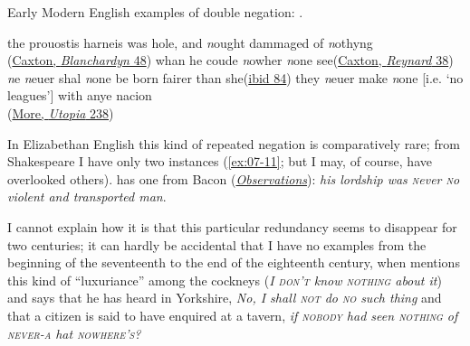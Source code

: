 Early Modern English examples of double negation: .

\ea \label{ex:07-07}
\ea the prouostis harneis was hole, and \emph{n}ought dammaged of \emph{n}othyng\\\hfill(\href{https://archive.org/details/caxtonsblanchard0000leon/page/48/mode/2up?q=%22harneis+was+hole%22&view=theater}{Caxton, \textit{Blanchardyn} 48}) %
\ex whan he coude \emph{n}owher \emph{n}one see\hfill(\href{https://archive.org/details/TheHistoryOfReynardTheFoxArber/page/n67/mode/2up?q=%22whan+he+coude%22&view=theater}{Caxton, \textit{Reynard} 38})
\ex \emph{n}e \emph{n}euer shal \emph{n}one be born fairer than she\hfill(\href{https://archive.org/details/TheHistoryOfReynardTheFoxArber/page/n113/mode/2up?q=%22neuer+shal+none%22&view=theater}{ibid 84})
\ex they \emph{n}euer make \emph{n}one [i.e. `no leagues'] with anye nacion\\\hfill(\href{https://archive.org/details/utopiasirthomas00robigoog/page/n349/mode/2up?q=%22they+neuer+make+none%22&view=theater}{More, \textit{Utopia} 238}) %
\z
\z

In Elizabethan English this kind of repeated negation is comparatively rare; from Shakespeare I have only two instances (\ref{ex:07-11}; but I may, of course, have overlooked others). \citet{bogholm1906bacon} has one from Bacon (\href{https://archive.org/details/lettersandlifef08bacogoog/page/n219/mode/2up?q=%22never+no+violent%22&view=theater}{\textit{Observations}}): \textit{his lordship was \textsc{n}ever \textsc{n}o violent and transported man}. %

I cannot explain how it is that this particular redundancy seems to disappear for two centuries; it can hardly be accidental that I have no examples from the beginning of the seventeenth to the end of the eighteenth century, when \citet[\href{https://archive.org/details/anecdotesofengli00peggrich/page/80/mode/2up?q=luxuriance&view=theater}{80}]{pegge1814anecdotes} mentions this kind of ``luxuriance'' among the cockneys (\textit{I \textsc{don't} know \textsc{nothing} about it}) and says that he has heard in Yorkshire, \textit{No, I shall \textsc{not} do \textsc{no} such thing} and that a citizen is said to have enquired at a tavern, \textit{if \textsc{nobody} had seen \textsc{nothing} of \textsc{never-a} hat \textsc{nowhere's}?}

